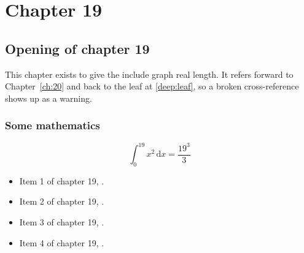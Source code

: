 \chapter{Chapter 19}
\label{ch:19}
\section{Opening of chapter 19}
This chapter exists to give the include graph real length. It refers
forward to Chapter~\ref{ch:20} and back to the leaf
at \ref{deep:leaf}, so a broken cross-reference shows up as a warning.

\subsection{Some mathematics}
\begin{equation}
  \int_0^{19} x^{2} \, \mathrm{d}x = \frac{19^{3}}{3}
\end{equation}

\begin{itemize}
  \item Item 1 of chapter 19, .
  \item Item 2 of chapter 19, .
  \item Item 3 of chapter 19, .
  \item Item 4 of chapter 19, .
\end{itemize}
